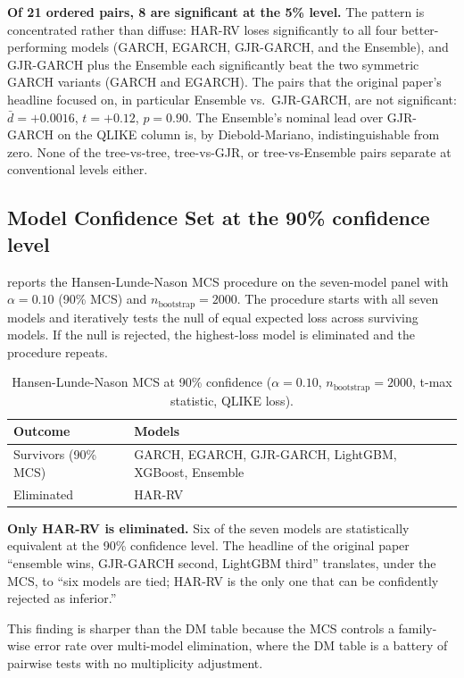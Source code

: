 \textbf{Of 21 ordered pairs, 8 are significant at the 5\% level.} The pattern is concentrated rather than diffuse: HAR-RV loses significantly to all four better-performing models (GARCH, EGARCH, GJR-GARCH, and the Ensemble), and GJR-GARCH plus the Ensemble each significantly beat the two symmetric GARCH variants (GARCH and EGARCH). The pairs that the original paper's headline focused on, in particular Ensemble vs.\ GJR-GARCH, are not significant: $\bar d = +0.0016$, $t = +0.12$, $p = 0.90$. The Ensemble's nominal lead over GJR-GARCH on the QLIKE column is, by Diebold-Mariano, indistinguishable from zero. None of the tree-vs-tree, tree-vs-GJR, or tree-vs-Ensemble pairs separate at conventional levels either.

\subsection{Model Confidence Set at the 90\% confidence level}

 reports the Hansen-Lunde-Nason MCS procedure on the seven-model panel with $\alpha = 0.10$ (90\% MCS) and $n_{\text{bootstrap}} = 2000$. The procedure starts with all seven models and iteratively tests the null of equal expected loss across surviving models. If the null is rejected, the highest-loss model is eliminated and the procedure repeats.

\begin{table}[H]
\centering
\small
\caption{Hansen-Lunde-Nason MCS at 90\% confidence ($\alpha=0.10$, $n_{\text{bootstrap}}=2000$, t-max statistic, QLIKE loss).}
\label{tab:demo_mcs}
\begin{tabular}{@{}l p{10cm}@{}}
\toprule
\textbf{Outcome} & \textbf{Models} \\
\midrule
Survivors (90\% MCS) & GARCH, EGARCH, GJR-GARCH, LightGBM, XGBoost, Ensemble \\
Eliminated           & HAR-RV \\
\bottomrule
\end{tabular}
\end{table}

\textbf{Only HAR-RV is eliminated.} Six of the seven models are statistically equivalent at the 90\% confidence level. The headline of the original paper ``ensemble wins, GJR-GARCH second, LightGBM third'' translates, under the MCS, to ``six models are tied; HAR-RV is the only one that can be confidently rejected as inferior.''

This finding is sharper than the DM table because the MCS controls a family-wise error rate over multi-model elimination, where the DM table is a battery of pairwise tests with no multiplicity adjustment.

